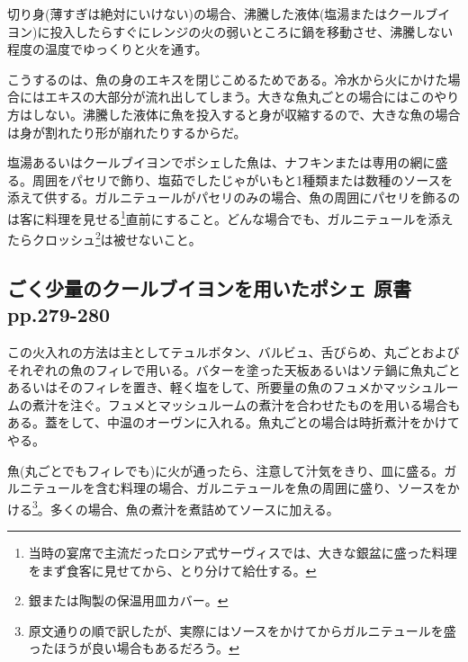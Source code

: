 切り身(薄すぎは絶対にいけない)の場合、沸騰した液体(塩湯またはクールブイヨン)に投入したらすぐにレンジの火の弱いところに鍋を移動させ、沸騰しない程度の温度でゆっくりと火を通す。

こうするのは、魚の身のエキスを閉じこめるためである。冷水から火にかけた場合にはエキスの大部分が流れ出してしまう。大きな魚丸ごとの場合にはこのやり方はしない。沸騰した液体に魚を投入すると身が収縮するので、大きな魚の場合は身が割れたり形が崩れたりするからだ。

塩湯あるいはクールブイヨンでポシェした魚は、ナフキンまたは専用の網に盛る。周囲をパセリで飾り、塩茹でしたじゃがいもと1種類または数種のソースを添えて供する。ガルニテュールがパセリのみの場合、魚の周囲にパセリを飾るのは客に料理を見せる\footnote{当時の宴席で主流だったロシア式サーヴィスでは、大きな銀盆に盛った料理をまず食客に見せてから、とり分けて給仕する。}直前にすること。どんな場合でも、ガルニテュールを添えたらクロッシュ\footnote{銀または陶製の保温用皿カバー。}は被せないこと。

\hypertarget{ux3054ux304fux5c11ux91cfux306eux30afux30fcux30ebux30d6ux30a4ux30e8ux30f3ux3092ux7528ux3044ux305fux30ddux30b7ux30a7-ux539fux66f8-pp.279-280}{%
\subsection{ごく少量のクールブイヨンを用いたポシェ 原書
pp.279-280}\label{ux3054ux304fux5c11ux91cfux306eux30afux30fcux30ebux30d6ux30a4ux30e8ux30f3ux3092ux7528ux3044ux305fux30ddux30b7ux30a7-ux539fux66f8-pp.279-280}}

この火入れの方法は主としてテュルボタン、バルビュ、舌びらめ、丸ごとおよびそれぞれの魚のフィレで用いる。バターを塗った天板あるいはソテ鍋に魚丸ごとあるいはそのフィレを置き、軽く塩をして、所要量の魚のフュメかマッシュルームの煮汁を注ぐ。フュメとマッシュルームの煮汁を合わせたものを用いる場合もある。蓋をして、中温のオーヴンに入れる。魚丸ごとの場合は時折煮汁をかけてやる。

魚(丸ごとでもフィレでも)に火が通ったら、注意して汁気をきり、皿に盛る。ガルニテュールを含む料理の場合、ガルニテュールを魚の周囲に盛り、ソースをかける\footnote{原文通りの順で訳したが、実際にはソースをかけてからガルニテュールを盛ったほうが良い場合もあるだろう。}。多くの場合、魚の煮汁を煮詰めてソースに加える。

\href{欠落アリ}{}

